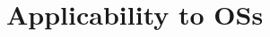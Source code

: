
\section{Applicability to \DIFdelbegin {}\DIFdelend \DIFaddbegin {}\DIFaddend OSs}\label{sec:other_os}




